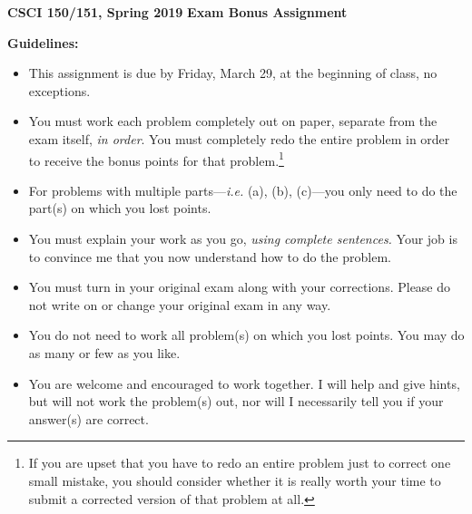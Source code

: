 \documentclass{article}
\begin{document}
\noindent \textbf{CSCI 150/151, Spring 2019}
\textbf{Exam Bonus Assignment}

\bigskip


\bigskip

\noindent\textbf{Guidelines:}
\begin{itemize}
\item  This assignment is due by Friday, March 29, at the beginning of
  class, no exceptions.
\item You must work each problem completely out on paper, separate
  from the exam itself, \emph{in order}.  You must completely redo the
  entire problem in order to receive the bonus points for that
  problem.\footnote{If you are upset that you have to redo an entire
    problem just to correct one small mistake, you should consider
    whether it is really worth your time to submit a corrected version
    of that problem at all.}
\item For problems with multiple parts---\emph{i.e.} (a), (b),
  (c)---you only need to do the part(s) on which you lost points.
\item You must explain your work as you go, \emph{using complete
    sentences.}  Your job is to convince me that you now understand
  how to do the problem.
\item You must turn in your original exam along with your corrections.
  Please do not write on or change your original exam in any way.
\item You do not need to work all problem(s) on which you lost points.
  You may do as many or few as you like.
\item You are welcome and encouraged to work together.  I will help
  and give hints, but will not work the problem(s) out, nor will I
  necessarily tell you if your answer(s) are correct.
\end{itemize}
\end{document}
